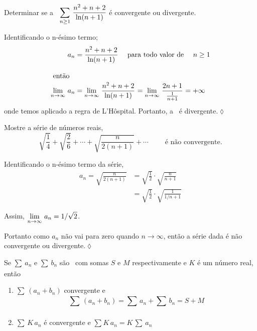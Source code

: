 \begin{exer}
Determinar se a \ser\ $\displaystyle{\sum_{n\geq 1}\,\frac{n^2+n+2}{\ln
(n+1)}}$ \'{e} convergente ou divergente.
\end{exer}

\solo Identificando o n-\'{e}simo termo;
\begin{align*}
  a_n &=\frac{n^2+n+2}{\ln
(n+1)} \quad \text{ para todo valor de }\quad n\geq 1  \\[2ex]
\intertext{ ent\~{a}o }
 \displaystyle{\lim_{n\to \infty}\,{a}_{n}} &= \displaystyle{\lim_{n\to \infty}\,{\frac{n^2+n+2}{\ln(n+1)}}_{}}=\displaystyle{\lim_{n\to \infty}\,{\frac{2n+1}
 {\frac{1}{n+1}}}_{}}=+\infty
\end{align*}
onde temos aplicado a regra de L'H\^{o}spital. Portanto, a \ser\ \'{e}
divergente.\hfill \(\lozenge\)

\begin{exer}
Mostre a s\'{e}rie de n\'{u}meros reais,
\begin{equation*}
  \sqrt{\frac{1}{4}}+\sqrt{\frac{2}{6}}+\cdots+\sqrt{\frac{n}{2(n+1)}}+\cdots\qquad \text{ \'{e} n\~{a}o convergente.}
\end{equation*}
\end{exer}

\solo Identificando o n-\'{e}simo termo da s\'{e}rie,
\begin{align*}
  a_n=\sqrt{\frac{n}{2(n+1)}} &=\sqrt{\frac{1}{2}}\cdot\sqrt{\frac{n}{n+1}}\\[2ex]
  &=\sqrt{\frac{1}{2}}\cdot\sqrt{\frac{1}{1/n+1}}
\end{align*}

Assim, $\displaystyle{\lim_{n\to\infty}\,a_n={1}/{\sqrt{2}}}$.

Portanto como $a_n$ n\~{a}o vai para zero quando $n\to\infty$, ent\~{a}o a
s\'{e}rie dada \'{e} n\~{a}o convergente ou divergente.\hfill \(\lozenge\)


\begin{theoc}{}{}
Se $\sum_{}\,a_{n}$ e $\sum_{}\,b_{n}$ s\~{a}o
\sers\ com somas $S$ e $M$ respectivamente e $K$ \'{e} um n\'{u}mero real,
ent\~{a}o
\begin{enumerate}[label=\rm{(\alph*)},leftmargin=4em,ref=\rm{(\alph*)}]
\item $\sum_{}\,(a_n + b_n)$ convergente e
\begin{equation*}
  \sum_{}\,(a_n + b_n)=\sum_{}\,a_n + \sum_{}\,b_n=S + M
\end{equation*}
\item $\sum_{}\,K\,a_{n}$ \'{e} convergente e $\sum_{}K\,a_n=K\, \sum_{}\,a_{n}$
\end{enumerate}
\end{theoc}

